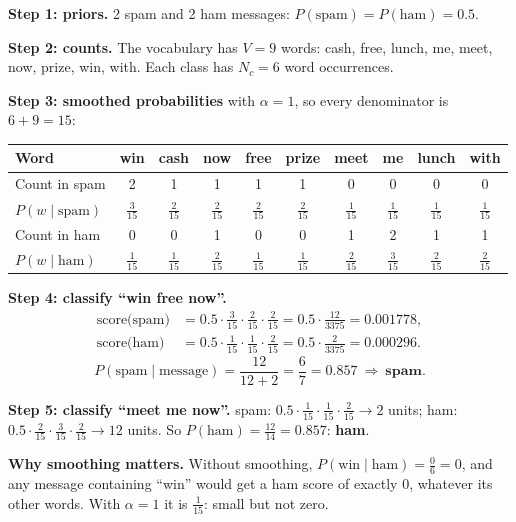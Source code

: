 \begin{example}
\textbf{Step 1: priors.} 2 spam and 2 ham messages: $P(\text{spam})=P(\text{ham})=0.5$.

\medskip
\textbf{Step 2: counts.} The vocabulary has $V=9$ words: cash, free, lunch, me, meet, now, prize, win, with. Each class has $N_c=6$ word occurrences.

\medskip
\textbf{Step 3: smoothed probabilities} with $\alpha=1$, so every denominator is $6+9=15$:

\begin{center}
\small
\begin{tabular}{@{}l|ccccccccc@{}}
\toprule
\textbf{Word} & win & cash & now & free & prize & meet & me & lunch & with\\
\midrule
Count in spam & 2 & 1 & 1 & 1 & 1 & 0 & 0 & 0 & 0\\
$P(w\mid\text{spam})$ & $\frac3{15}$ & $\frac2{15}$ & $\frac2{15}$ & $\frac2{15}$ & $\frac2{15}$ & $\frac1{15}$ & $\frac1{15}$ & $\frac1{15}$ & $\frac1{15}$\\
\midrule
Count in ham & 0 & 0 & 1 & 0 & 0 & 1 & 2 & 1 & 1\\
$P(w\mid\text{ham})$ & $\frac1{15}$ & $\frac1{15}$ & $\frac2{15}$ & $\frac1{15}$ & $\frac1{15}$ & $\frac2{15}$ & $\frac3{15}$ & $\frac2{15}$ & $\frac2{15}$\\
\bottomrule
\end{tabular}
\end{center}

\medskip
\textbf{Step 4: classify ``win free now''.}
\begin{align*}
\text{score(spam)}&=0.5\cdot\tfrac3{15}\cdot\tfrac2{15}\cdot\tfrac2{15}=0.5\cdot\tfrac{12}{3375}=0.001778,\\
\text{score(ham)}&=0.5\cdot\tfrac1{15}\cdot\tfrac1{15}\cdot\tfrac2{15}=0.5\cdot\tfrac{2}{3375}=0.000296 .
\end{align*}
\[
P(\text{spam}\mid\text{message})=\frac{12}{12+2}=\frac{6}{7}=\mathbf{0.857}\ \Rightarrow\ \textbf{spam}.
\]

\medskip
\textbf{Step 5: classify ``meet me now''.} spam: $0.5\cdot\frac1{15}\cdot\frac1{15}\cdot\frac2{15}\to2$ units; ham: $0.5\cdot\frac2{15}\cdot\frac3{15}\cdot\frac2{15}\to12$ units. So $P(\text{ham})=\frac{12}{14}=0.857$: \textbf{ham}.

\medskip
\textbf{Why smoothing matters.} Without smoothing, $P(\text{win}\mid\text{ham})=\frac06=0$, and any message containing ``win'' would get a ham score of exactly $0$, whatever its other words. With $\alpha=1$ it is $\frac1{15}$: small but not zero.
\end{example}

